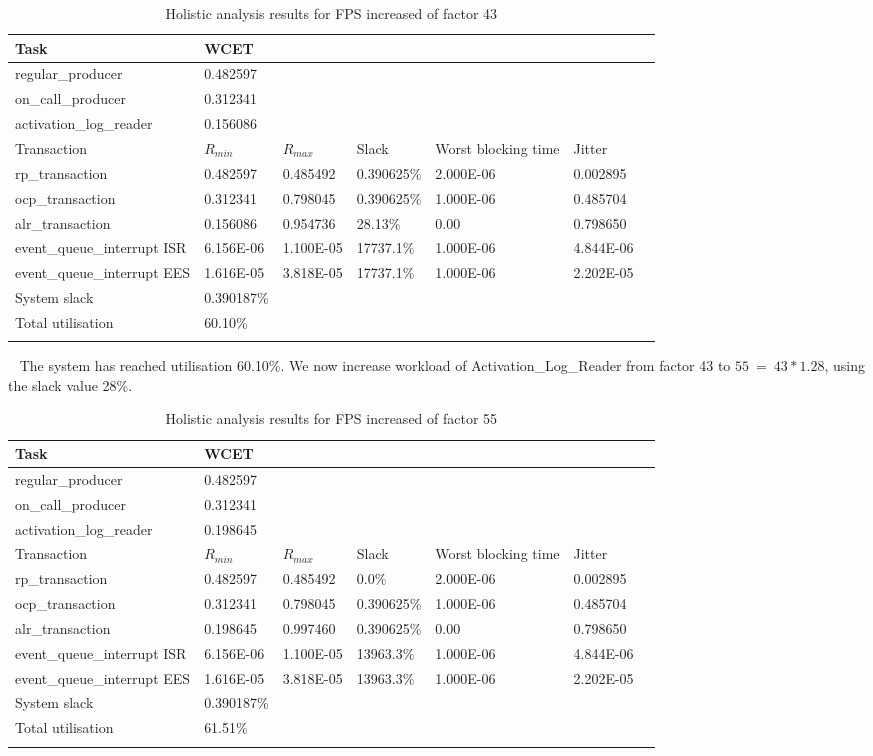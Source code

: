 \documentclass{article}
\begin{document}
\begin{longtable}{lllllll}
   \toprule
   Task & WCET \\
   \midrule
   regular\_producer & 0.482597 \\
   on\_call\_producer & 0.312341 \\
   activation\_log\_reader & 0.156086 \\
   \toprule
   \toprule
   Transaction & $R_{min}$ & $R_{max}$ & Slack & Worst blocking time & Jitter \\
   \midrule
   rp\_transaction & 0.482597 & 0.485492  & 0.390625\% &  2.000E-06 & 0.002895 \\
   ocp\_transaction & 0.312341 & 0.798045 & 0.390625\% & 1.000E-06 & 0.485704 \\
   alr\_transaction & 0.156086 & 0.954736 & 28.13\% & 0.00 & 0.798650 \\
   event\_queue\_interrupt ISR & 6.156E-06 & 1.100E-05 & 17737.1\% & 1.000E-06 & 4.844E-06 \\
   event\_queue\_interrupt EES & 1.616E-05 & 3.818E-05 & 17737.1\% & 1.000E-06 & 2.202E-05 \\
   \toprule
   \toprule
   System slack & 0.390187\% \\
   Total utilisation & 60.10\% \\
   \bottomrule
   \caption{Holistic analysis results for FPS increased of factor 43}
\label{tab:holistic-fps-24-ocp-44}
\end{longtable}
 
The system has reached utilisation 60.10\%. We now increase workload of Activation\_Log\_Reader from factor 43 to $55\ =\ 43 * 1.28$, using the slack value 28\%.

\begin{longtable}{lllllll}
   \toprule
   Task & WCET \\
   \midrule
   regular\_producer & 0.482597 \\
   on\_call\_producer & 0.312341 \\
   activation\_log\_reader & 0.198645 \\
   \toprule
   \toprule
   Transaction & $R_{min}$ & $R_{max}$ & Slack & Worst blocking time & Jitter \\
   \midrule
   rp\_transaction & 0.482597 & 0.485492  & 0.0\% &  2.000E-06 & 0.002895 \\
   ocp\_transaction & 0.312341 & 0.798045 & 0.390625\% & 1.000E-06 & 0.485704 \\
   alr\_transaction & 0.198645 & 0.997460 & 0.390625\% & 0.00 & 0.798650 \\
   event\_queue\_interrupt ISR & 6.156E-06 & 1.100E-05 & 13963.3\% & 1.000E-06 & 4.844E-06 \\
   event\_queue\_interrupt EES & 1.616E-05 & 3.818E-05 & 13963.3\% & 1.000E-06 & 2.202E-05 \\
   \toprule
   \toprule
   System slack & 0.390187\% \\
   Total utilisation & 61.51\% \\
   \bottomrule
   \caption{Holistic analysis results for FPS increased of factor 55}
\label{tab:holistic-fps-24-ocp-44-alr-56}
\end{longtable}
\end{document}
